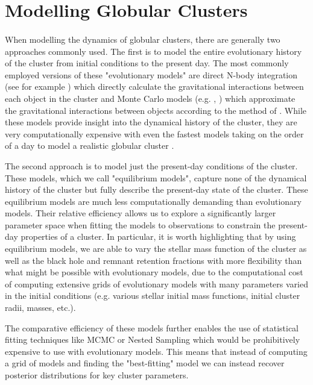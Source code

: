 \section{Modelling Globular Clusters}

\paragraph{}


When modelling the dynamics of globular clusters, there are generally two approaches commonly used.
The first is to model the entire evolutionary history of the cluster from initial conditions to the
present day. The most commonly employed versions of these "evolutionary models" are direct N-body
integration (see for example \citealt{Baumgardt2017a}) which directly calculate the gravitational
interactions between each object in the cluster and Monte Carlo models (e.g.
\citealt{Rodriguez2021}, \citealt{Hypki2013}) which approximate the gravitational interactions
between objects according to the method of \citet{Henon1971}. While these models provide insight
into the dynamical history of the cluster, they are very computationally expensive with even the
fastest models taking on the order of a day to model a realistic globular cluster
\citep{Rodriguez2021}.

The second approach is to model just the present-day conditions of the cluster. These models, which
we call "equilibrium models", capture none of the dynamical history of the cluster but fully
describe the present-day state of the cluster. These equilibrium models are much less
computationally demanding than evolutionary models. Their relative efficiency allows us to explore a
significantly larger parameter space when fitting the models to observations to constrain the
present-day properties of a cluster. In particular, it is worth highlighting that by using
equilibrium models, we are able to vary the stellar mass function of the cluster as well as the
black hole and remnant retention fractions with more flexibility than what might be possible with
evolutionary models, due to the computational cost of computing extensive grids of evolutionary
models with many parameters varied in the initial conditions (e.g. various stellar initial mass
functions, initial cluster radii, masses, etc.).

The comparative efficiency of these models further enables the use of statistical fitting techniques
like MCMC or Nested Sampling which would be prohibitively expensive to use with evolutionary models.
This means that instead of computing a grid of models and finding the "best-fitting" model we can
instead recover posterior distributions for key cluster parameters.


